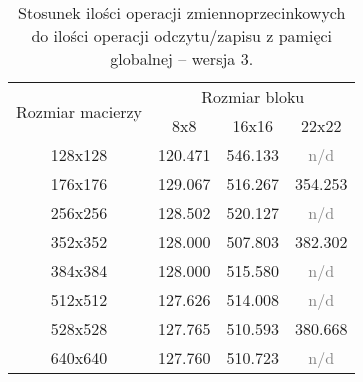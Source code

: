 \begin{enumerate}
\begin{table}[H]
\centering
\begin{tabular}{|c|c|c|c|}
\hline
\multirow{2}{*}{Rozmiar macierzy} & \multicolumn{3}{c|}{Rozmiar bloku} \\ \cline{2-4}
& 8x8 & 16x16 & 22x22 \\ \hline
128x128 & 120.471 & 546.133 & \textcolor{gray}{n/d} \\ \hline
176x176 & 129.067 & 516.267 & 354.253 \\ \hline
256x256 & 128.502 & 520.127 & \textcolor{gray}{n/d} \\ \hline
352x352 & 128.000 & 507.803 & 382.302 \\ \hline
384x384 & 128.000 & 515.580 & \textcolor{gray}{n/d} \\ \hline
512x512 & 127.626 & 514.008 & \textcolor{gray}{n/d} \\ \hline
528x528 & 127.765 & 510.593 & 380.668 \\ \hline
640x640 & 127.760 & 510.723 & \textcolor{gray}{n/d} \\ \hline
\end{tabular}
\caption{Stosunek ilości operacji zmiennoprzecinkowych do ilości operacji odczytu/zapisu z pamięci globalnej -- wersja 3.}
\end{table}

\end{enumerate}
